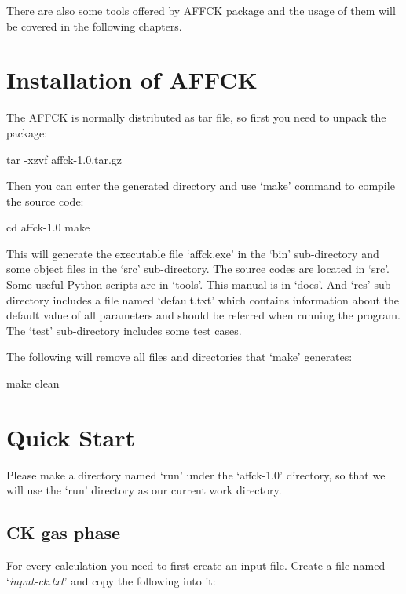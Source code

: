 \documentclass[11pt]{book}
\begin{document}
There are also some tools offered by AFFCK package and the usage of them will be covered in the following chapters.

\section{Installation of AFFCK}

The AFFCK is normally distributed as tar file, so first you need to unpack the package:

\begin{everbatim}
tar -xzvf affck-1.0.tar.gz
\end{everbatim}

Then you can enter the generated directory and use `make' command to compile the source code:

\begin{everbatim}
cd affck-1.0
make
\end{everbatim}

This will generate the executable file `affck.exe' in the `bin' sub-directory and some object files in the `src' sub-directory.
The source codes are located in `src'. Some useful Python scripts are in `tools'. This manual is in `docs'. And `res' sub-directory 
includes a file named `default.txt' which contains information about the default value of all parameters and should be referred when 
running the program. The `test' sub-directory includes some test cases.

The following will remove all files and directories that `make' generates:

\begin{everbatim}
make clean
\end{everbatim}

\section{Quick Start}

Please make a directory named `run' under the `affck-1.0' directory, so that we will use the `run' directory as our current work directory.

\subsection{CK gas phase}\label{ckgp}

For every calculation you need to first create an input file. Create a file named `\emph{input-ck.txt}' and copy the following into it:
\end{document}
